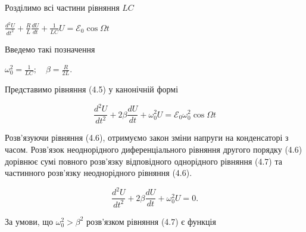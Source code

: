 \documentclass[12pt,a4paper]{article}
\begin{document}
    \vspace{0.5em}

    Розділимо всі частини рівняння $LC$

    \vspace{0.5em}

    \begin{center}
        $\displaystyle \frac{d^2U}{dt^2} + \frac{R}{L} \frac{dU}{dt} + \frac{1}{LC}U = \mathcal{E}_0 \cos \Omega t$
    \end{center}

    \vspace{0.5em}

    Введемо такі позначення

    \vspace{0.5em}

    \begin{center}
        $\displaystyle \omega_0^2 = \frac{1}{LC}; \quad \beta = \frac{R}{2L}$.
    \end{center}

    Представимо рівняння (4.5) у канонічній формі

    \vspace{0.5em}

    \begin{equation}
        \frac{d^2U}{dt^2} + 2\beta \frac{dU}{dt} + \omega_0^2 U = \mathcal{E}_0 \omega_0^2 \cos \Omega t
        \tag{4.6}
    \end{equation}

    \vspace{0.5em}

    Розв’язуючи рівняння (4.6), отримуємо закон зміни напруги на конденсаторі з часом. Розв’язок неоднорідного диференціального рівняння другого порядку (4.6) дорівнює сумі повного розв’язку відповідного однорідного рівняння (4.7) та частинного розв’язку неоднорідного
    рівняння (4.6).

    \vspace{0.5em}

    \begin{equation}
        \frac{d^2U}{dt^2} + 2 \beta \frac{dU}{dt} + \omega_0^2 U = 0.
        \tag{4.7}
    \end{equation}

    \vspace{0.5em}

    За умови, що $\omega_0^2 > \beta^2$ розв’язком рівняння (4.7) є функція

    \vspace{0.5em}
\end{document}
